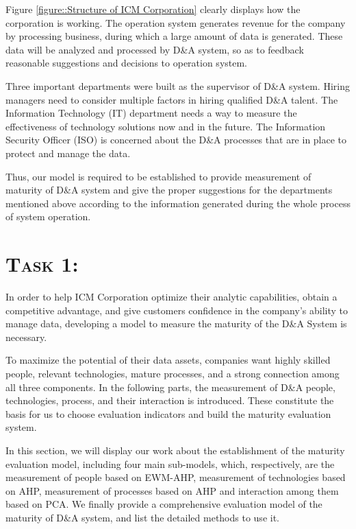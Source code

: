 \documentclass{mcmthesis}
\begin{document}
Figure \ref{figure::Structure of ICM Corporation}  clearly displays how the corporation is working. The operation system generates revenue for the company by processing business, during which a large amount of data is generated. These data will be analyzed and processed by D\&A system, so as to feedback reasonable suggestions and decisions to operation system. 

Three important departments were built as the supervisor of D\&A system. Hiring managers need to consider multiple factors in hiring qualified D\&A talent. The Information Technology (IT) department needs a way to measure the effectiveness of technology solutions now and in the future. The Information Security Officer (ISO) is concerned about the D\&A processes that are in place to protect and manage the data. 

Thus, our model is required to be established to provide measurement of maturity of D\&A system and give the proper suggestions for the departments mentioned above according to the information generated during the whole process of system operation.


\section{\scshape{Task 1:} }
In order to help ICM Corporation optimize their analytic capabilities, obtain a competitive advantage, and give customers confidence in the company’s ability to manage data, developing a model to measure the maturity of the D\&A System is necessary.

To maximize the potential of their data assets, companies want highly skilled people, relevant technologies, mature processes, and a strong connection among all three components. In the following parts, the measurement of D\&A people, technologies, process, and their interaction is introduced.  These constitute the basis for us to choose evaluation indicators and build the maturity evaluation system.

In this section, we will display our work about the establishment of the maturity evaluation model, including four main sub-models, which, respectively, are the measurement of people based on EWM-AHP, measurement of technologies based on AHP, measurement of processes based on AHP and interaction among them based on PCA. We finally provide a comprehensive evaluation model of the maturity of D\&A system, and list the detailed methods to use it.
\end{document}

